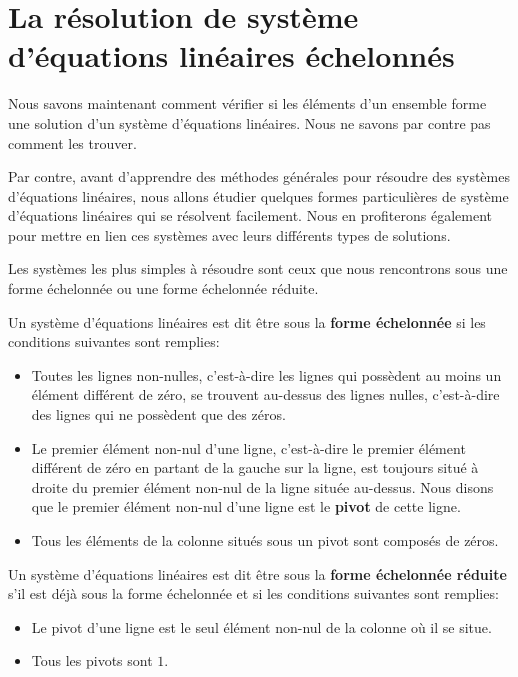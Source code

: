 \documentclass[]{book}
\providecommand{\tightlist}{%
  \setlength{\itemsep}{0pt}\setlength{\parskip}{0pt}}
\theoremstyle{definition}
\theoremstyle{definition}
\theoremstyle{definition}
\theoremstyle{remark}
\let\BeginKnitrBlock\begin \let\EndKnitrBlock\end
\begin{document}
\hypertarget{systeme-equation-lineaire-echelonnee}{%
\section{La résolution de système d'équations linéaires échelonnés}\label{systeme-equation-lineaire-echelonnee}}

Nous savons maintenant comment vérifier si les éléments d'un ensemble forme une solution d'un système d'équations linéaires. Nous ne savons par contre pas comment les trouver.

Par contre, avant d'apprendre des méthodes générales pour résoudre des systèmes d'équations linéaires, nous allons étudier quelques formes particulières de système d'équations linéaires qui se résolvent facilement. Nous en profiterons également pour mettre en lien ces systèmes avec leurs différents types de solutions.

Les systèmes les plus simples à résoudre sont ceux que nous rencontrons sous une forme échelonnée ou une forme échelonnée réduite.

\BeginKnitrBlock{definition}
\protect\hypertarget{def:unnamed-chunk-17}{}{\label{def:unnamed-chunk-17} }Un système d'équations linéaires est dit être sous la \textbf{forme échelonnée} si les conditions suivantes sont remplies:

\begin{itemize}
\tightlist
\item
  Toutes les lignes non-nulles, c'est-à-dire les lignes qui possèdent au moins un élément différent de zéro, se trouvent au-dessus des lignes nulles, c'est-à-dire des lignes qui ne possèdent que des zéros.
\item
  Le premier élément non-nul d'une ligne, c'est-à-dire le premier élément différent de zéro en partant de la gauche sur la ligne, est toujours situé à droite du premier élément non-nul de la ligne située au-dessus. Nous disons que le premier élément non-nul d'une ligne est le \textbf{pivot} de cette ligne.
\item
  Tous les éléments de la colonne situés sous un pivot sont composés de zéros.
\end{itemize}

Un système d'équations linéaires est dit être sous la \textbf{forme échelonnée réduite} s'il est déjà sous la forme échelonnée et si les conditions suivantes sont remplies:

\begin{itemize}
\tightlist
\item
  Le pivot d'une ligne est le seul élément non-nul de la colonne où il se situe.
\item
  Tous les pivots sont \(1\).
\end{itemize}
\EndKnitrBlock{definition}
\end{document}
